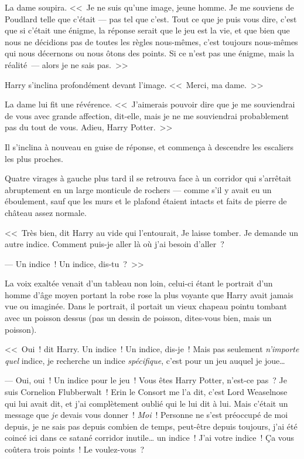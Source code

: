 La dame soupira. <<~Je ne suis qu'une image, jeune homme. Je me souviens de Poudlard telle que c'était — pas tel que c'est. Tout ce que je puis vous dire, c'est que si c'était une énigme, la réponse serait que le jeu est la vie, et que bien que nous ne décidions pas de toutes les règles nous-mêmes, c'est toujours nous-mêmes qui nous décernons ou nous ôtons des points. Si ce n'est pas une énigme, mais la réalité~— alors je ne sais pas.~>>

Harry s'inclina profondément devant l'image. <<~Merci, ma dame.~>>

La dame lui fit une révérence. <<~J'aimerais pouvoir dire que je me souviendrai de vous avec grande affection, dit-elle, mais je ne me souviendrai probablement pas du tout de vous. Adieu, Harry Potter.~>>

Il s'inclina à nouveau en guise de réponse, et commença à descendre les escaliers les plus proches.

Quatre virages à gauche plus tard il se retrouva face à un corridor qui s'arrêtait abruptement en un large monticule de rochers — comme s'il y avait eu un éboulement, sauf que les murs et le plafond étaient intacts et faits de pierre de château assez normale.

<<~Très bien, dit Harry au vide qui l'entourait, Je laisse tomber. Je demande un autre indice. Comment puis-je aller là où j'ai besoin d'aller~?

--- Un indice~! Un indice, dis-tu~?~>>

La voix exaltée venait d'un tableau non loin, celui-ci étant le portrait d'un homme d'âge moyen portant la robe rose la plus voyante que Harry avait jamais vue ou imaginée. Dans le portrait, il portait un vieux chapeau pointu tombant avec un poisson dessus (pas un dessin de poisson, dites-vous bien, mais un poisson).

<<~Oui~! dit Harry. Un indice~! Un indice, dis-je~! Mais pas seulement \emph{n'importe quel} indice, je recherche un indice \emph{spécifique}, c'est pour un jeu auquel je joue…

--- Oui, oui~! Un indice pour le jeu~! Vous êtes Harry Potter, n'est-ce pas~? Je suis Cornelion Flubberwalt~! Erin le Consort me l'a dit, c’est Lord Weaselnose qui lui avait dit, et j’ai complètement oublié qui le lui dit à lui. Mais c'était un message que \emph{je} devais vous donner~! \emph{Moi}~! Personne ne s'est préoccupé de moi depuis, je ne sais pas depuis combien de temps, peut-être depuis toujours, j'ai été coincé ici dans ce satané corridor inutile… un indice~! J'ai votre indice~! Ça vous coûtera trois points~! Le voulez-vous~?

